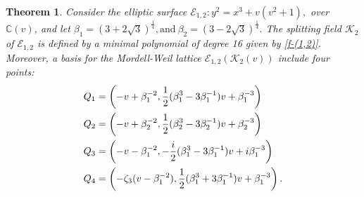 \documentclass[11pt]{amsart}
\newcommand{\Ee}{{\mathcal E}}
\newcommand{\KK}{{\mathcal K}}
\newtheorem{thm}{Theorem}[section]
\numberwithin{equation}{section}
\numberwithin{table}{section}
\newcommand\<{\langle}
\begin{document}
	\begin{thm}
		\label{main6}
 Consider the  elliptic surface  	$ \Ee_{1, 2}: y^2 = x^3 + v(v^2 + 1), $
over  $\mathbb{C}(v)$, and let $\beta_1= (3+2\sqrt{3})^{\frac{1}{4}},  \text{and} \ \beta_2=(3-2\sqrt{3})^{\frac{1}{4}}. $
The splitting field $\mathcal{K}_2$ of $\Ee_{1, 2}$  is    defined by a minimal polynomial of degree 16 given by \ref{f-(1,2)}.
	Moreover, a basis for the Mordell-Weil lattice  $ \Ee_{1,2}(\KK_2(v))$  include four points:
	\begin{align}
	Q_1 &= \left( -v + \beta_1^{-2},   \frac{1}{2}(\beta_1^3 - 3\beta_1^{-1})v + \beta_1^{-3} \right) \notag \\
	Q_2 &= \left( -v + \beta_2^{-2},   \frac{1}{2}(\beta_2^3 - 3\beta_2^{-1})v + \beta_2^{-3} \right) \notag \\
		Q_3 &= \left( -v - \beta_1^{-2},  -\frac{i}{2}(\beta_1^3 - 3\beta_1^{-1})v + i\beta_1^{-3} \right)\notag  \\
	Q_4 &= \left( -\zeta_3 (v-\beta_1^{-2}),  \frac{1}{2}( \beta_1^3 + 3\beta_1^{-1})v +\beta_1^{-3} \right). \label{Q-(1,2)}
\end{align}

\end{thm}

	 	
\end{document}
